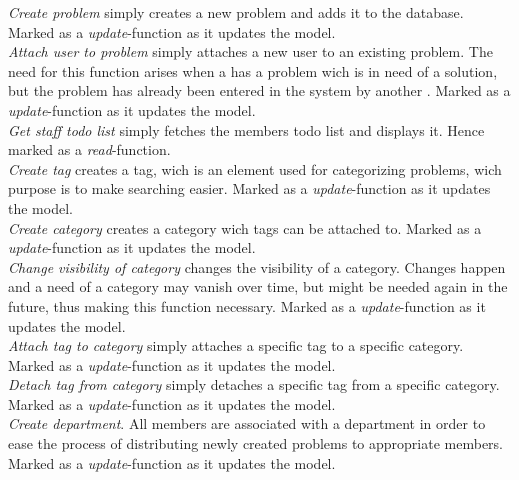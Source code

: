 \emph{Create problem} simply creates a new problem and adds it to the database. Marked as a \textit{update}-function as it updates the model.  \\
\emph{Attach user to problem} simply attaches a new user to an existing problem. The need for this function arises when a \client has a problem wich is in need of a solution, but the problem has already been entered in the system by another \client. Marked as a \textit{update}-function as it updates the model. \\
\emph{Get staff todo list} simply fetches the \astaff[] members todo list and displays it. Hence marked as a \textit{read}-function. \\
\emph{Create tag} creates a tag, wich is an element used for categorizing problems, wich purpose is to make searching easier. Marked as a \textit{update}-function as it updates the model. \\
\emph{Create category} creates a category wich tags can be attached to. Marked as a \textit{update}-function as it updates the model. \\
\emph{Change visibility of category} changes the visibility of a category. Changes happen and a need of a category may vanish over time, but might be needed again in the future, thus making this function necessary. Marked as a \textit{update}-function as it updates the model. \\
\emph{Attach tag to category} simply attaches a specific tag to a specific category. Marked as a \textit{update}-function as it updates the model. \\
\emph{Detach tag from category} simply detaches a specific tag from a specific category. Marked as a \textit{update}-function as it updates the model. \\
\emph{Create department}. All \astaff[] members are associated with a department in order to ease the process of distributing newly created problems to appropriate \astaff[] members. Marked as a \textit{update}-function as it updates the model. \\

